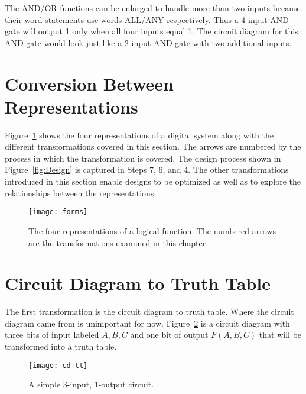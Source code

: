 The AND/OR functions can be enlarged to handle more than
two inputs because their word statements use words ALL/ANY
respectively.  Thus a 4-input AND gate will output 1
only when all four inputs equal 1.  The circuit diagram for 
this AND gate would look just like a 2-input AND gate with
two additional inputs.

\section{Conversion Between Representations}
Figure~\ref{fig:representationsForms} shows the four representations of a digital system
along with the different transformations covered in this section.  
The arrows are numbered by the process in which the transformation is
covered.  The design process shown in Figure~\ref{fig:Design} is captured
in Steps 7, 6, and 4.  The other transformations introduced in this 
section enable designs to be optimized as well as to explore 
the relationships between the representations.

\begin{figure}[ht]
\texttt{[image: forms]}
\caption{The four representations of a logical function.  The
numbered arrows are the transformations examined in this chapter.}
\label{fig:representationsForms}
\end{figure}

\section{Circuit Diagram to Truth Table}

The first transformation is the circuit diagram to truth table.  
Where the circuit diagram came from is unimportant for now.
Figure~\ref{fig:representationsCD-TT} is a circuit diagram with three bits of 
input labeled $A,B,C$ and one bit of output $F(A,B,C)$ that will
be transformed into a truth table.

\begin{figure}[ht]
\texttt{[image: cd-tt]}
\caption{A simple 3-input, 1-output circuit.}
\label{fig:representationsCD-TT}
\end{figure}


